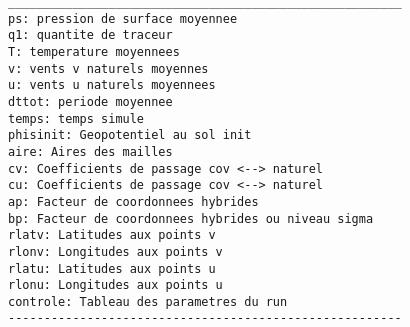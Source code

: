 \begin{verbatim}
_______________________________________________________
ps: pression de surface moyennee 
q1: quantite de traceur 
T: temperature moyennees 
v: vents v naturels moyennes 
u: vents u naturels moyennees 
dttot: periode moyennee 
temps: temps simule 
phisinit: Geopotentiel au sol init 
aire: Aires des mailles 
cv: Coefficients de passage cov <--> naturel 
cu: Coefficients de passage cov <--> naturel 
ap: Facteur de coordonnees hybrides
bp: Facteur de coordonnees hybrides ou niveau sigma
rlatv: Latitudes aux points v 
rlonv: Longitudes aux points v 
rlatu: Latitudes aux points u 
rlonu: Longitudes aux points u 
controle: Tableau des parametres du run 
-------------------------------------------------------
\end{verbatim}
